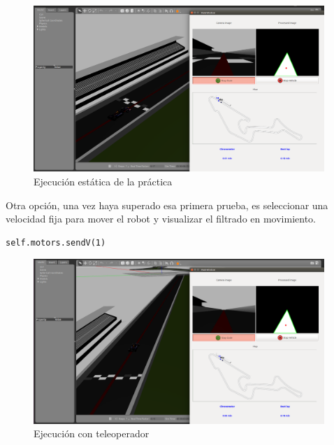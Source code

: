 \begin{figure}[H]
  \begin{center}
    \includegraphics[width=0.98\textwidth]{figures/ejec_estat_chrono.png}
		\caption{Ejecución estática de la práctica}
		\label{fig.eech}
		\end{center}
\end{figure}

Otra opción, una vez haya superado esa primera prueba, es seleccionar una velocidad fija para mover el robot y visualizar el filtrado en movimiento.

\lstset{language=Python, breaklines=true, basicstyle=\footnotesize}
\begin{lstlisting}[frame=single]
self.motors.sendV(1)
\end{lstlisting}

\begin{figure}[H]
  \begin{center}
    \includegraphics[width=0.98\textwidth]{figures/ejec_semiestat_chrono.png}
		\caption{Ejecución con teleoperador}
		\label{fig.esech}
		\end{center}
\end{figure}

